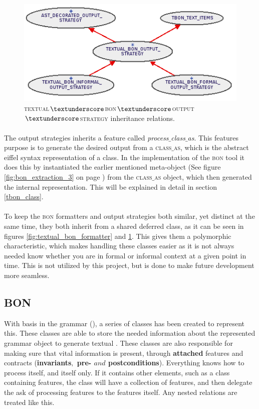 \begin{figure}[h]
\centerline{
\includegraphics[scale=0.7]{images/bon-extraction-output-strategy.png}
}
\caption{\textsc{textual$\textunderscore$bon$\textunderscore$output$\textunderscore$strategy} inheritance relations.}
\label{fig:bon-extraction-output-strategy}
\end{figure}

\paragraph{}
The output strategies inherits a feature called \textit{process$\_$class$\_$as}. This features purpose is to generate the desired output from a \textsc{class$\_$as}, which is the abstract eiffel syntax representation of a class. In the implementation of the \textsc{bon} tool it does this by instantiated the earlier mentioned meta-object (See figure \ref{fig:bon_extraction_3} on page \pageref{fig:bon_extraction_3}) from the \textsc{class$\_$as} object, which then generated the internal representation. This will be explained in detail in section \ref{tbon_class}.

\paragraph{}
To keep the \textsc{bon} formatters and output strategies both similar, yet distinct at the same time, they both inherit from a shared deferred class, as it can be seen in figures \ref{fig:textual_bon_formatter} and \ref{fig:bon-extraction-output-strategy}. This gives them a polymorphic characteristic, which makes handling these classes easier as it is not always needed know whether you are in formal or informal context at a given point in time. This is not utilized by this project, but is done to make future development more seamless. 

\subsection{BON}
With basis in the \bon{ } grammar (\cite{walden1995}), a series of classes has been created to represent this. These classes are able to store the needed information about the represented grammar object to generate textual \bon. These classes are also responsible for making sure that vital information is present, through \textbf{attached} features and contracts (\textbf{invariants$,$ pre- $and$ postconditions}). Everything knows how to process itself, and itself only. If it contains other elements, such as a class containing features, the class will have a collection of features, and then delegate the ask of processing features to the features itself. Any nested relations are treated like this.

